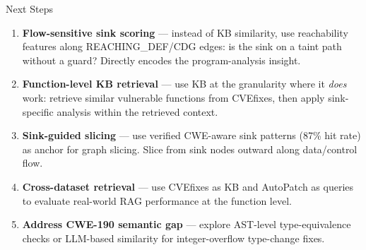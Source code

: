 \documentclass[aspectratio=169,10pt]{beamer}
\begin{document}
\begin{frame}{Next Steps}
  \begin{enumerate}
    \item[\textcolor{c1}{\faIcon{project-diagram}}]
      \textbf{Flow-sensitive sink scoring} — instead of KB similarity,
      use reachability features along REACHING\_DEF/CDG edges: is the sink
      on a taint path without a guard? Directly encodes the program-analysis insight.

    \vspace{0.4em}
    \item[\textcolor{c3}{\faIcon{expand-arrows-alt}}]
      \textbf{Function-level KB retrieval} — use KB at the granularity where
      it \emph{does} work: retrieve similar vulnerable functions from CVEfixes,
      then apply sink-specific analysis within the retrieved context.

    \vspace{0.4em}
    \item[\textcolor{c5}{\faIcon{crosshairs}}]
      \textbf{Sink-guided slicing} — use verified CWE-aware sink patterns (87\% hit rate)
      as anchor for graph slicing. Slice from sink nodes outward along data/control flow.

    \vspace{0.4em}
    \item[\textcolor{hit}{\faIcon{search}}]
      \textbf{Cross-dataset retrieval} — use CVEfixes as KB and AutoPatch as queries
      to evaluate real-world RAG performance at the function level.

    \vspace{0.4em}
    \item[\textcolor{warn}{\faIcon{code}}]
      \textbf{Address CWE-190 semantic gap} — explore AST-level type-equivalence
      checks or LLM-based similarity for integer-overflow type-change fixes.
  \end{enumerate}
\end{frame}


\begin{frame}[plain]
\centering
\vspace{3em}
\end{frame}
\end{document}
